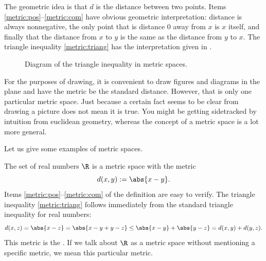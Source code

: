\documentclass[12pt]{book}
\begin{document}
The geometric idea is that $d$ is the distance between two points. 
Items \ref{metric:pos}--\ref{metric:com} have obvious geometric
interpretation: distance is always nonnegative, the only point that is
distance 0 away from $x$ is $x$ itself, and finally that the distance from
$x$ to $y$ is the same as the distance from $y$ to $x$.
The triangle
inequality \ref{metric:triang} has the interpretation given in
.
\begin{figure}[h!t]
\begin{center}

\caption{Diagram of the triangle inequality in metric spaces.\label{fig:mstriang}}
\end{center}
\end{figure}

For the purposes of drawing, it is convenient to draw figures and
diagrams in the plane and have the metric be the standard distance.
However, that is only one particular metric space.
Just because a
certain fact seems to be clear from drawing a picture does not mean it is
true.
You might be getting sidetracked by intuition from euclidean
geometry,
whereas the concept of a metric space is a lot more general.

Let us give some examples of metric spaces.

\begin{example}
The set of real numbers $\R$ is a metric space with the metric
\begin{equation*}
d(x,y) := \abs{x-y} .
\end{equation*}
Items \ref{metric:pos}--\ref{metric:com} of the definition
are easy to verify.
The
triangle inequality \ref{metric:triang} follows immediately
from the standard triangle inequality for real numbers:
\begin{equation*}
d(x,z) = \abs{x-z} = 
\abs{x-y+y-z} \leq
\abs{x-y}+\abs{y-z} =
d(x,y)+ d(y,z) .
\end{equation*}
This metric is the \emph{}.
If we talk
about $\R$ as a metric space without mentioning a specific metric, we 
mean this particular metric.
\end{example}
\end{document}
